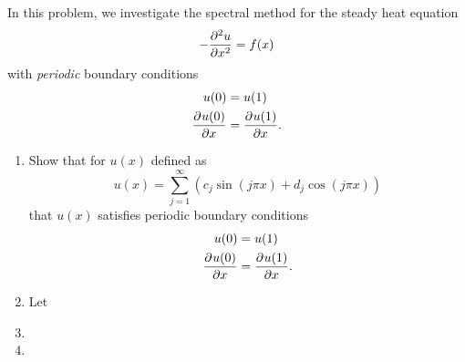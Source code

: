 In this problem, we investigate the spectral method for the steady heat equation
\[
-\frac{\partial^{2} u}{\partial x^{2}} = f(x)
\]
with \emph{periodic} boundary conditions
\begin{align*}
u(0) &= u(1)\\
\frac{\partial^{} u(0)}{\partial x^{}} &= \frac{\partial^{} u(1)}{\partial x^{}}.
\end{align*}

\begin{enumerate}
\item Show that for $u(x)$ defined as
\[
u(x) = \sum_{j = 1}^\infty \left( c_j \sin(j\pi x) + d_j \cos(j\pi x)\right)
\]
that $u(x)$ satisfies periodic boundary conditions 
\begin{align*}
u(0) &= u(1)\\
\frac{\partial^{} u(0)}{\partial x^{}} &= \frac{\partial^{} u(1)}{\partial x^{}}.
\end{align*}
\item Let 
\item 
\item 
\end{enumerate}